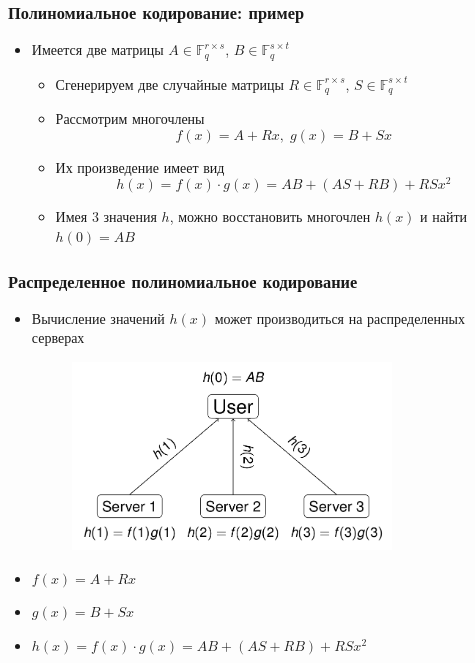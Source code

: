 \documentclass{beamer}
\begin{document}
    \begin{frame}
        \frametitle{Полиномиальное кодирование: пример}
        \begin{itemize}
            \item Имеется две матрицы $A \in \mathbb{F}_q^{r\times s}$, $B \in \mathbb{F}_q^{s\times t}$
            \begin{itemize}
                \item<1-> Сгенерируем две случайные матрицы $R \in \mathbb{F}_q^{r\times s}$, $S \in \mathbb{F}_q^{s\times t}$
                \item<2-> Рассмотрим многочлены
                \begin{equation*}
                    f(x) = A + Rx, \; g(x) = B + Sx
                \end{equation*}
                \item<3-> Их произведение имеет вид
                \begin{equation*}
                    h(x) = f(x) \cdot g(x) = AB + \left(AS + RB\right) + RSx^2
                \end{equation*}
                \item<4-> Имея 3 значения $h$, можно восстановить многочлен $h(x)$ и найти $h(0) = AB$
            \end{itemize}
        \end{itemize}
    \end{frame}

    \begin{frame}

        \frametitle{Распределенное полиномиальное кодирование}
        \begin{itemize}
            \item Вычисление значений $h(x)$ может производиться на распределенных серверах
            \begin{figure}[t!]
                \includegraphics[width=0.8\textwidth]{poly_code.png}
            \end{figure}
            \item $f(x) = A + Rx$
            \item $g(x) = B + Sx$
            \item $h(x) = f(x) \cdot g(x) = AB + \left(AS + RB\right) + RSx^2$
        \end{itemize}
        
    \end{frame}
\end{document}
